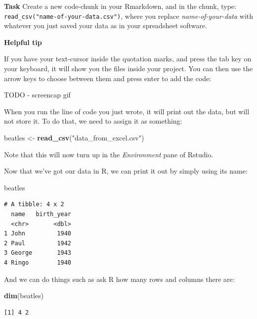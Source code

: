\documentclass[]{book}
\newenvironment{Shaded}{\begin{snugshade}}{\end{snugshade}}
\newcommand{\KeywordTok}[1]{\textcolor[rgb]{0.13,0.29,0.53}{\textbf{#1}}}
\newcommand{\NormalTok}[1]{#1}
\newcommand{\StringTok}[1]{\textcolor[rgb]{0.31,0.60,0.02}{#1}}
\begin{document}
\textbf{Task}
Create a new code-chunk in your Rmarkdown, and in the chunk, type:
\texttt{read\_csv("name-of-your-data.csv")}, where you replace \emph{name-of-your-data} with whatever you just saved your data as in your spreadsheet software.

\textbf{Helpful tip}

If you have your text-cursor inside the quotation marks, and press the tab key on your keyboard, it will show you the files inside your project. You can then use the arrow keys to choose between them and press enter to add the code:

TODO - screencap gif

When you run the line of code you just wrote, it will print out the data, but will not store it. To do that, we need to assign it as something:

\begin{Shaded}
\begin{Highlighting}[]
\NormalTok{beatles <-}\StringTok{ }\KeywordTok{read_csv}\NormalTok{(}\StringTok{"data_from_excel.csv"}\NormalTok{)}
\end{Highlighting}
\end{Shaded}

Note that this will now turn up in the \emph{Environment} pane of Rstudio.

Now that we've got our data in R, we can print it out by simply using its name:

\begin{Shaded}
\begin{Highlighting}[]
\NormalTok{beatles}
\end{Highlighting}
\end{Shaded}

\begin{verbatim}
# A tibble: 4 x 2
  name   birth_year
  <chr>       <dbl>
1 John         1940
2 Paul         1942
3 George       1943
4 Ringo        1940
\end{verbatim}

And we can do things such as ask R how many rows and columns there are:

\begin{Shaded}
\begin{Highlighting}[]
\KeywordTok{dim}\NormalTok{(beatles)}
\end{Highlighting}
\end{Shaded}

\begin{verbatim}
[1] 4 2
\end{verbatim}
\end{document}
